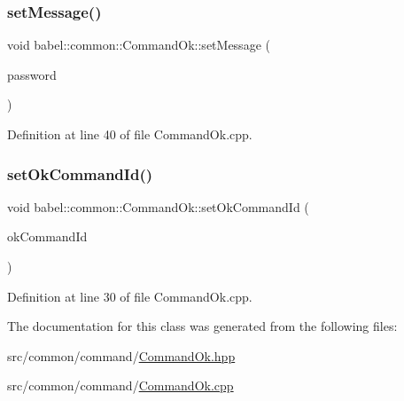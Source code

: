 \subsubsection{\texorpdfstring{set\+Message()}{setMessage()}}
{\footnotesize\ttfamily void babel\+::common\+::\+Command\+Ok\+::set\+Message (\begin{DoxyParamCaption}\item[{const std\+::string \&}]{password }\end{DoxyParamCaption})}



Definition at line 40 of file Command\+Ok.\+cpp.

\mbox{\label{classbabel_1_1common_1_1_command_ok_a6a68be469749258e63542ff368949330}} 
\subsubsection{\texorpdfstring{set\+Ok\+Command\+Id()}{setOkCommandId()}}
{\footnotesize\ttfamily void babel\+::common\+::\+Command\+Ok\+::set\+Ok\+Command\+Id (\begin{DoxyParamCaption}\item[{\mbox{\hyperlink{namespacebabel_1_1common_a2d31f246c776da6bf656bd71e86cbb2c}{Command\+Name}}}]{ok\+Command\+Id }\end{DoxyParamCaption})}



Definition at line 30 of file Command\+Ok.\+cpp.



The documentation for this class was generated from the following files\+:\begin{DoxyCompactItemize}
\item 
src/common/command/\mbox{\hyperlink{_command_ok_8hpp}{Command\+Ok.\+hpp}}\item 
src/common/command/\mbox{\hyperlink{_command_ok_8cpp}{Command\+Ok.\+cpp}}\end{DoxyCompactItemize}
